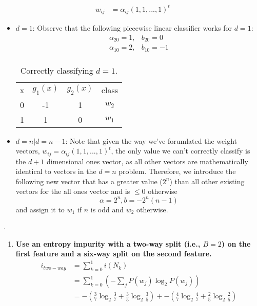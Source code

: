 \documentclass[12pt]{article}
\begin{document}
\begin{enumerate}
\begin{enumerate}
\begin{equation}
\begin{split}
w_{ij} &= \alpha_{ij}(1,1,...,1)^t
\end{split}
\end{equation}
\begin{itemize}
\item{$d=1$:} Observe that the following piecewise linear classifier works for $d=1$:
\begin{equation}
\begin{split}
\alpha_{20} = 1, &b_{20} = 0 \\
\alpha_{10} = 2, &b_{10} = -1 \\
\end{split}
\end{equation}
\begin{table}[H]
\centering
\begin{tabular}{cccc}
x & $g_1(x)$ & $g_2(x)$ & class \\
0 & -1 & 1 & $w_2$ \\
1 & 1 & 0 & $w_1$
\end{tabular}
\caption{Correctly classifying $d=1$.}
\end{table}
\item{$d=n|d=n-1$:} Note that given the way we've forumlated the weight vectors, $w_{ij} = \alpha_{ij}(1,1,...,1)^t$, the only value we can't correctly classify is the $d+1$ dimensional ones vector, as all other vectors are mathematically identical to vectors in the $d=n$ problem. Therefore, we introduce the following new vector that has a greater value ($2^n$) than all other existing vectors for the all ones vector and is $\leq 0$ otherwise
\begin{equation}
\alpha = 2^n, b = -2^n(n-1)
\end{equation}
and assign it to $w_1$ if $n$ is odd and $w_2$ otherwise.
\end{itemize}
\end{enumerate}
. \\
\begin{enumerate}
\item \textbf{Use an entropy impurity with a two-way split (i.e., $B=2$) on the first feature and a six-way split on the second feature.}
\begin{equation}
\begin{split}
i_{two-way} &= \sum_{k=0}^1i(N_k) \\
&= \sum_{k=0}^1\left (-\sum_jP(w_j)\log_2P(w_j)\right) \\
& = -(\frac{3}{7}\log_2\frac{3}{7} + \frac{3}{5}\log_2\frac{3}{5}) + -(\frac{4}{7}\log_2\frac{4}{7} + \frac{2}{5}\log_2\frac{2}{5}) \\

\end{split}
\end{equation}
\end{enumerate}
\end{enumerate}
\end{document}
